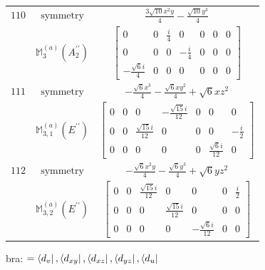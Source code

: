 \documentclass[fleqn,8pt,landscape]{jsarticle}
\begin{document}
\begin{longtable}{ccc}
$ 110 $ & $ \text{symmetry} $ & $ \frac{3 \sqrt{10} x^{2} y}{4} - \frac{\sqrt{10} y^{3}}{4} $ \\
$  $ & $ \mathbb{M}_{3}^{(a)}(A_{2}^{\prime\prime}) $ & $ \begin{bmatrix} 0 & 0 & \frac{i}{4} & 0 & 0 & 0 & 0 \\ 0 & 0 & 0 & - \frac{i}{4} & 0 & 0 & 0 \\ - \frac{\sqrt{6} i}{4} & 0 & 0 & 0 & 0 & 0 & 0 \end{bmatrix} $ \\ \hline
$ 111 $ & $ \text{symmetry} $ & $ - \frac{\sqrt{6} x^{3}}{4} - \frac{\sqrt{6} x y^{2}}{4} + \sqrt{6} x z^{2} $ \\
$  $ & $ \mathbb{M}_{3,1}^{(a)}(E^{\prime\prime}) $ & $ \begin{bmatrix} 0 & 0 & 0 & - \frac{\sqrt{15} i}{12} & 0 & 0 & 0 \\ 0 & 0 & \frac{\sqrt{15} i}{12} & 0 & 0 & 0 & - \frac{i}{2} \\ 0 & 0 & 0 & 0 & 0 & \frac{\sqrt{6} i}{12} & 0 \end{bmatrix} $ \\ \hline
$ 112 $ & $ \text{symmetry} $ & $ - \frac{\sqrt{6} x^{2} y}{4} - \frac{\sqrt{6} y^{3}}{4} + \sqrt{6} y z^{2} $ \\
$  $ & $ \mathbb{M}_{3,2}^{(a)}(E^{\prime\prime}) $ & $ \begin{bmatrix} 0 & 0 & \frac{\sqrt{15} i}{12} & 0 & 0 & 0 & \frac{i}{2} \\ 0 & 0 & 0 & \frac{\sqrt{15} i}{12} & 0 & 0 & 0 \\ 0 & 0 & 0 & 0 & - \frac{\sqrt{6} i}{12} & 0 & 0 \end{bmatrix} $ \\ \hline
\end{longtable}
bra: $=\bra{d_{v}}, \bra{d_{xy}}, \bra{d_{xz}}, \bra{d_{yz}}, \bra{d_{u}}$
\end{document}
